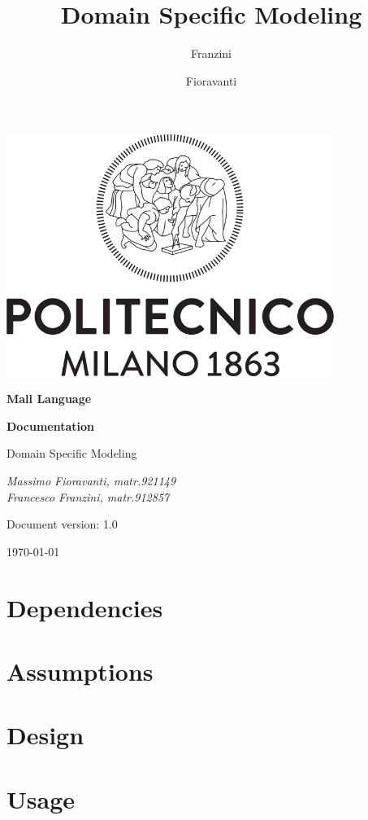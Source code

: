 \documentclass[a4paper]{article}
\author{Franzini \and Fioravanti}
\title{Domain Specific Modeling}
\begin{document}
	
\begin{titlepage}
	\centering
	\includegraphics[width=0.80\textwidth]{pictures/Logo_Politecnico_Milano}\par
	\vspace{1.5cm}
	{\LARGE \textbf {Mall Language} \par}
	\vspace{0.3cm}
	{\large \textbf{Documentation} \par}
	\vspace{1.5cm}
	{\Large{Domain Specific Modeling} \par}
	\vspace{1.5cm}
	{\Large\itshape Massimo Fioravanti, matr.921149 \\
				    Francesco Franzini, matr.912857 \\ }
	\vspace{2cm}
	\vfill
	{\large Document version: 1.0\par}
	{\large \today \par}
\end{titlepage}	
	
\maketitle
\tableofcontents
\clearpage

\section{Dependencies}
\section{Assumptions}
\section{Design}
\section{Usage}
	
\end{document}
